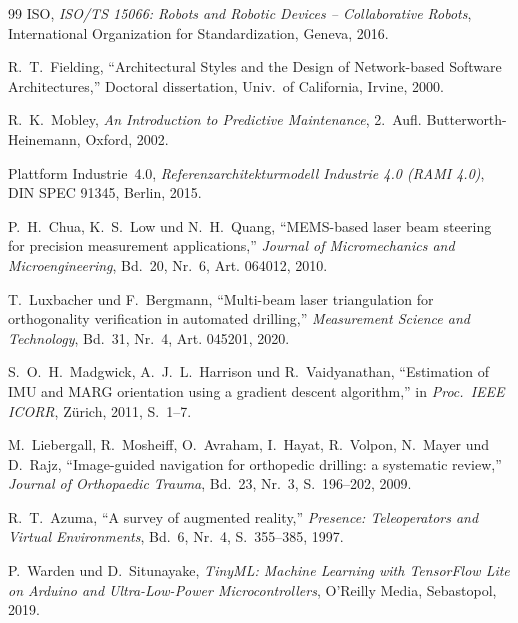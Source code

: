 ﻿\documentclass[a4paper,12pt]{article}
\theoremstyle{definition}
\begin{document}
\begin{thebibliography}{99}
ISO, \textit{ISO/TS 15066: Robots and Robotic Devices -- Collaborative Robots},
International Organization for Standardization, Geneva, 2016.

R.~T.~Fielding, ``Architectural Styles and the Design of Network-based Software Architectures,''
Doctoral dissertation, Univ.\ of California, Irvine, 2000.

R.~K.~Mobley, \textit{An Introduction to Predictive Maintenance},
2.~Aufl. Butterworth-Heinemann, Oxford, 2002.

Plattform Industrie~4.0, \textit{Referenzarchitekturmodell Industrie 4.0 (RAMI 4.0)},
DIN SPEC 91345, Berlin, 2015.

P.~H.~Chua, K.~S.~Low und N.~H.~Quang, ``MEMS-based laser beam steering for
precision measurement applications,'' \textit{Journal of Micromechanics and Microengineering},
Bd.~20, Nr.~6, Art. 064012, 2010.

T.~Luxbacher und F.~Bergmann, ``Multi-beam laser triangulation for orthogonality
verification in automated drilling,'' \textit{Measurement Science and Technology},
Bd.~31, Nr.~4, Art. 045201, 2020.

S.~O.~H.~Madgwick, A.~J.~L.~Harrison und R.~Vaidyanathan, ``Estimation of IMU
and MARG orientation using a gradient descent algorithm,''
in \textit{Proc.\ IEEE ICORR}, Zürich, 2011, S.~1--7.

M.~Liebergall, R.~Mosheiff, O.~Avraham, I.~Hayat, R.~Volpon, N.~Mayer und D.~Rajz,
``Image-guided navigation for orthopedic drilling: a systematic review,''
\textit{Journal of Orthopaedic Trauma}, Bd.~23, Nr.~3, S.~196--202, 2009.

R.~T.~Azuma, ``A survey of augmented reality,''
\textit{Presence: Teleoperators and Virtual Environments},
Bd.~6, Nr.~4, S.~355--385, 1997.

P.~Warden und D.~Situnayake, \textit{TinyML: Machine Learning with TensorFlow
Lite on Arduino and Ultra-Low-Power Microcontrollers},
O'Reilly Media, Sebastopol, 2019.

\end{thebibliography}
\end{document}
